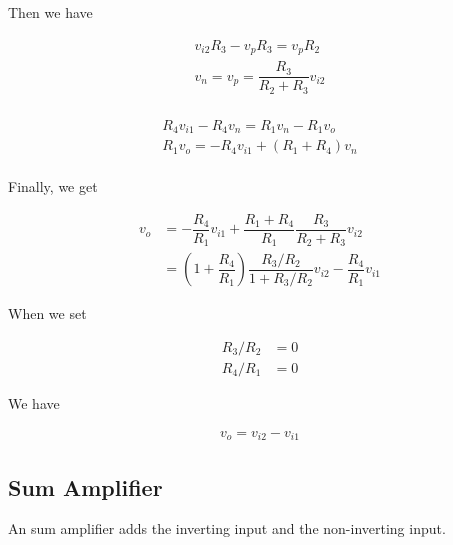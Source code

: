 Then we have

\begin{equation*}
  \begin{aligned}
    v_{i2} R_3 - v_p R_3 = v_p R_2 \\
    v_n = v_p = \dfrac{R_3}{R_2 + R_3} v_{i2} \\
  \end{aligned}
\end{equation*}

\begin{equation*}
  \begin{aligned}
    R_4 v_{i1} - R_4 v_n = R_1 v_n - R_1 v_o \\
    R_1 v_o = - R_4 v_{i1} + \left( R_1 + R_4 \right) v_n \\
  \end{aligned}
\end{equation*}

Finally, we get

\begin{equation*}
  \begin{aligned}
    v_o &= - \dfrac{R_4}{R_1} v_{i1} + \dfrac{R_1 + R_4}{R_1}  \dfrac{R_3}{R_2 + R_3} v_{i2} \\
        &= \left( 1 + \dfrac{R_4}{R_1} \right) \dfrac{R_3 / R_2 }{1 + R_3 / R_2} v_{i2} - \dfrac{R_4}{R_1} v_{i1}  
  \end{aligned}
\end{equation*}

When we set

\begin{equation*}
  \begin{aligned}
    R_3 / R_2 &= 0 \\
    R_4 / R_1 &= 0
  \end{aligned}
\end{equation*}

We have

\begin{equation*}
  \begin{aligned}
    v_o = v_{i2} - v_{i1}
  \end{aligned}
\end{equation*}

\subsection{Sum Amplifier}

An sum amplifier adds the inverting input and the non-inverting input.

